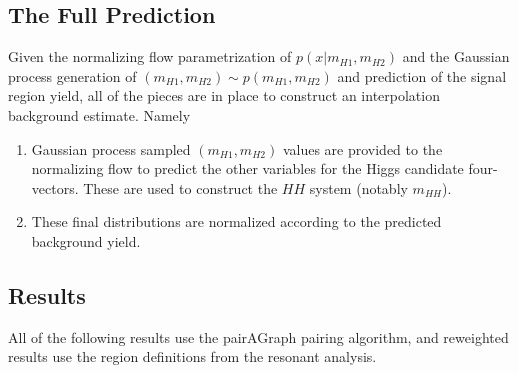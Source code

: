 \subsection{The Full Prediction}
Given the normalizing flow parametrization of $p(x | m_{H1}, m_{H2})$ and the Gaussian process generation of 
$(m_{H1}, m_{H2}) \sim p(m_{H1}, m_{H2})$ and prediction of the signal region yield, all of the pieces are 
in place to construct an interpolation background estimate. Namely
\begin{enumerate}
	\item Gaussian process sampled $(m_{H1}, m_{H2})$ values are provided to the normalizing flow to predict 
	the other variables for the Higgs candidate four-vectors. These are used to construct the $HH$ system (notably 
	$m_{HH}$).
	\item These final distributions are normalized according to the predicted background yield.
\end{enumerate}

\subsection{Results}
All of the following results use the pairAGraph pairing algorithm, and reweighted results use the region 
definitions from the resonant analysis.

